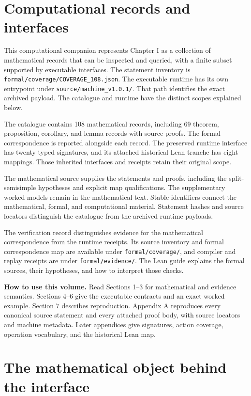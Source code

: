 \documentclass[a4paper,11pt]{article}
\begin{document}
\KomorebiCover


\section*{Computational records and interfaces}
This computational companion represents Chapter I as a collection of mathematical records that can be inspected and queried, with a finite subset supported by executable interfaces. The statement inventory is \nolinkurl{formal/coverage/COVERAGE_108.json}. The executable runtime has its own entrypoint under \nolinkurl{source/machine_v1.0.1/}. That path identifies the exact archived payload. The catalogue and runtime have the distinct scopes explained below.

The catalogue contains 108 mathematical records, including 69 theorem, proposition, corollary, and lemma records with source proofs. The formal correspondence is reported alongside each record. The preserved runtime interface has twenty typed signatures, and its attached historical Lean tranche has eight mappings. Those inherited interfaces and receipts retain their original scope.

The mathematical source supplies the statements and proofs, including the split-semisimple hypotheses and explicit map qualifications. The supplementary worked models remain in the mathematical text. Stable identifiers connect the mathematical, formal, and computational material. Statement hashes and source locators distinguish the catalogue from the archived runtime payloads.

The verification record distinguishes evidence for the mathematical correspondence from the runtime receipts. Its source inventory and formal correspondence map are available under \nolinkurl{formal/coverage/}, and compiler and replay receipts are under \nolinkurl{formal/evidence/}. The Lean guide explains the formal sources, their hypotheses, and how to interpret those checks.

\textbf{How to use this volume.} Read Sections 1--3 for mathematical and evidence semantics. Sections 4--6 give the executable contracts and an exact worked example. Section 7 describes reproduction. Appendix A reproduces every canonical source statement and every attached proof body, with source locators and machine metadata. Later appendices give signatures, action coverage, operation vocabulary, and the historical Lean map.
\clearpage\tableofcontents\clearpage
\section{The mathematical object behind the interface}
\end{document}
